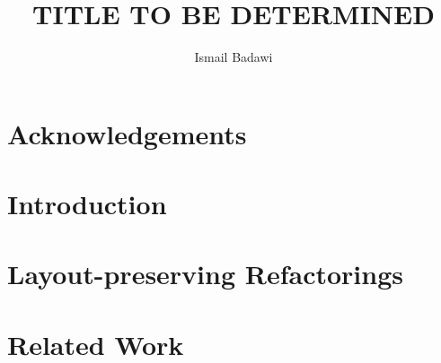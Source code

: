 \documentclass[MSc,twoside,openright]{Thesis}
\title{TITLE TO BE DETERMINED}
\author{Ismail Badawi}
\begin{document}
\pagestyle{empty}

\maketitle
\cleardoublepage

\preface %

\begin{Abstract}

\end{Abstract}

\begin{Resume}

\end{Resume}

\chapter*{Acknowledgements}



\renewcommand{\contentsname}{Table of Contents}%
\addto\captionsenglish{%
  \renewcommand{\contentsname}%
    {Table of Contents}%
}
\addto\captionsenglish{%
  \renewcommand{\lstlistlistingname}%
    {List of Listings}%
}

\tableofcontents
\listoffigures
\listoftables
\renewcommand{\lstlistlistingname}{List of Listings}
\cleardoublepage

\maintext %

\pagestyle{fancyplain}

\chapter{Introduction} \label{chap:Introduction}


\chapter{Layout-preserving Refactorings} \label{chap:Layout}


\chapter{Related Work} \label{chap:Related}

\end{document}
